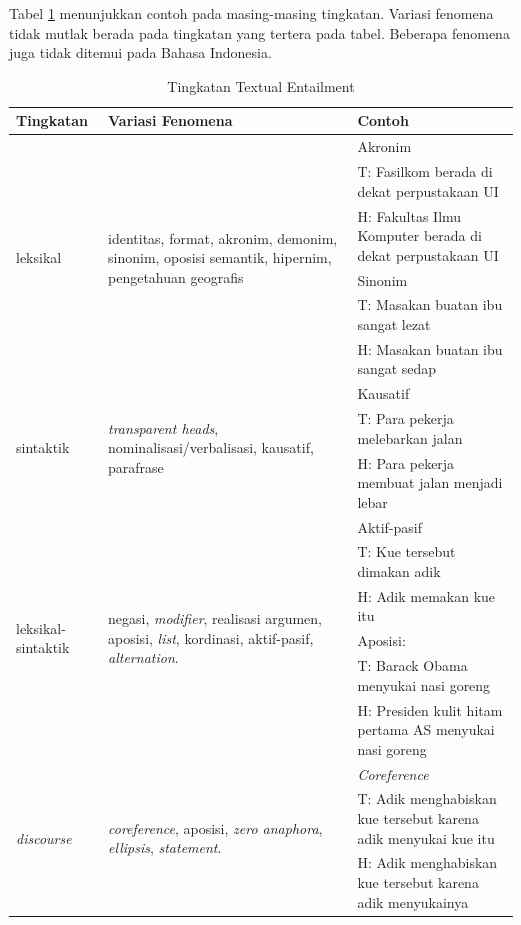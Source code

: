 	Tabel \ref{table:tingkat-TE} menunjukkan contoh pada masing-masing tingkatan. Variasi fenomena tidak mutlak berada pada tingkatan yang tertera pada tabel. Beberapa fenomena juga tidak ditemui pada Bahasa Indonesia.
	\begin{table}
		\centering
		\caption{Tingkatan Textual Entailment}
		\label{table:tingkat-TE}
		\begin{tabular}{|p{2cm}|p{4cm}|p{7cm}|}
			\hline
			Tingkatan & Variasi Fenomena & \multicolumn{1}{l|}{Contoh} \\ \hline 
			\multirow{6}{*}{leksikal} & \multirow{6}{4cm}{identitas, format, akronim, demonim, sinonim, oposisi semantik, hipernim, pengetahuan geografis} & Akronim \\
			&  & T: Fasilkom berada di dekat perpustakaan UI \\
			&  & H: Fakultas Ilmu Komputer berada di dekat perpustakaan UI \\
			&  & Sinonim \\
			&  & T: Masakan buatan ibu sangat lezat \\
			&  & H: Masakan buatan ibu sangat sedap \\ \hline
			\multirow{3}{*}{sintaktik} & \multirow{3}{4cm}{\textit{transparent heads}, nominalisasi/verbalisasi, kausatif, parafrase} & Kausatif \\
			&  & T: Para pekerja melebarkan jalan \\
			&  & H: Para pekerja membuat jalan menjadi lebar \\ \hline
			\multirow{6}{2cm}{leksikal-sintaktik} & \multirow{6}{4cm}{negasi, \textit{modifier}, realisasi argumen, aposisi, \textit{list}, kordinasi, aktif-pasif, \textit{alternation}.} & Aktif-pasif \\
			&  & T: Kue tersebut dimakan adik \\
			&  & H: Adik memakan kue itu \\
			&  & Aposisi: \\
			&  & T: Barack Obama menyukai nasi goreng \\
			&  & H: Presiden kulit hitam pertama AS menyukai nasi goreng \\ \hline
			\multirow{3}{*}{\textit{discourse}} & \multirow{3}{4cm}{\textit{coreference}, aposisi, \textit{zero anaphora}, \textit{ellipsis}, \textit{statement}.} & \textit{Coreference} \\
			&  & T: Adik menghabiskan kue tersebut karena adik menyukai kue itu \\
			&  & H: Adik menghabiskan kue tersebut karena adik menyukainya \\ \hline

\end{tabular}
\end{table}

